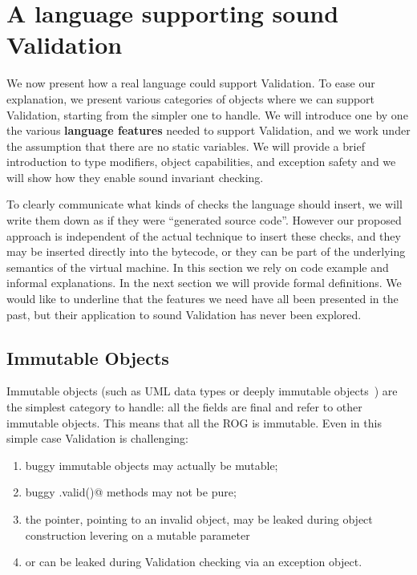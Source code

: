 \saveSpace
\section{A language supporting sound Validation}
\label{s:language}
\saveSpace
We now present how a real language could support
Validation. To ease our explanation, we present various categories
of objects where we can support Validation, starting from the simpler one to handle.
We will introduce one by one the various
\textbf{language features} needed 
to support Validation, and we work under the assumption that there are no static variables.
We will provide a brief introduction to type modifiers, object capabilities, and exception safety and we will show how they enable sound invariant checking.

To clearly communicate what kinds of checks the language should insert,
 we will write them down as if they were ``generated source code''. 
However our proposed approach is independent of the actual technique to insert these checks, and they may be inserted directly into the bytecode, or they can be part of the underlying semantics of the virtual machine.
In this section we rely on code example and informal explanations. In the next section we will provide formal definitions.
We would like to underline that the
features we need have all been presented in the past, but their application to sound Validation has never been explored.
\saveSpace
\subsection{Immutable Objects}
\label{s:immutable}
\saveSpace
Immutable objects (such as UML data types or deeply immutable objects~\cite{Potanin2013}) are the simplest category to handle: all the fields are final and refer to other immutable objects.
This means that all the ROG is immutable.
Even in this simple case Validation is challenging:
\begin{enumerate}
  \item buggy immutable objects may actually be mutable;
  \item buggy \Q@.valid()@ methods may not be pure;
  \item the \Q@this@ pointer, pointing to an invalid object, may be leaked during object
 construction levering on a mutable parameter
\item or can be leaked during Validation checking via an exception object.
\end{enumerate}
\saveSpace\saveSpace
